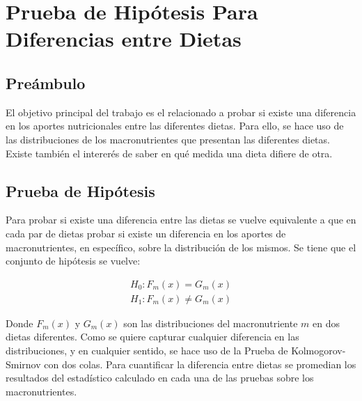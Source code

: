 \documentclass[12pt,a4paper]{article}
\begin{document}
\newpage

\section{Prueba de Hipótesis Para Diferencias entre Dietas}
    \subsection{Preámbulo}
    {
        El objetivo principal del trabajo es el relacionado a probar si 
        existe una diferencia en los aportes nutricionales entre las diferentes 
        dietas. Para ello, se hace uso de las distribuciones de los macronutrientes 
        que presentan las diferentes dietas. Existe también el intererés de saber 
        en qué medida una dieta difiere de otra.
    }

    \subsection{Prueba de Hipótesis}
    {
        Para probar si existe una diferencia entre las dietas se vuelve equivalente 
        a que en cada par de dietas probar si existe un diferencia en los aportes 
        de macronutrientes, en específico, sobre la distribución de los mismos. 
        Se tiene que el conjunto de hipótesis se vuelve:
        
        \begin{align*}
            H_0 : F_m(x) = G_m(x) \\
            H_1 : F_m(x) \ne G_m(x)
        \end{align*}

        Donde $F_m(x)$ y $G_m(x)$ son las distribuciones del macronutriente $m$ en 
        dos dietas diferentes. Como se quiere capturar cualquier diferencia en las 
        distribuciones, y en cualquier sentido, se hace uso de la Prueba de 
        Kolmogorov-Smirnov con dos colas. Para cuantificar la diferencia entre dietas 
        se promedian los resultados del estadístico calculado en cada una de las pruebas 
        sobre los macronutrientes.
    }
\end{document}
